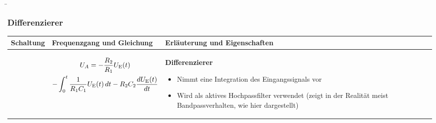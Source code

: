 \begin{frame}
    \b{
    \frametitle{Differenzierer}
    \centering
    \begin{table}[ht]
    \label{tab:Differenzierer}
    \begin{tabular}{|m{}|m{}|m{}|}
    \hline
    Schaltung & Frequenzgang und Gleichung & Erläuterung und Eigenschaften\\ %
    \hline
    \vspace{0.5cm}
    \centering
    
    &
    \begin{center}
    
    \begin{multline*}
        U_A = - \frac{R_2}{R_1} U_{\textnormal{E}}(t) \\
        - \int_0^t \frac{1}{R_1 C_1} U_{\textnormal{E}}(t) \, dt 
        - R_2 C_2\frac{dU_{\textnormal{E}}(t)}{dt}
    \end{multline*}
    \end{center} 
    & 
    \textbf{Differenzierer}\newline
    \begin{itemize}
        \item Nimmt eine Integration des Eingangssignals vor
        \item Wird als aktives Hochpassfilter verwendet (zeigt in der Realität meist Bandpassverhalten, wie hier dargestellt)
    \end{itemize} \\
    \hline
    \end{tabular}
    \end{table}
    }
\end{frame}


